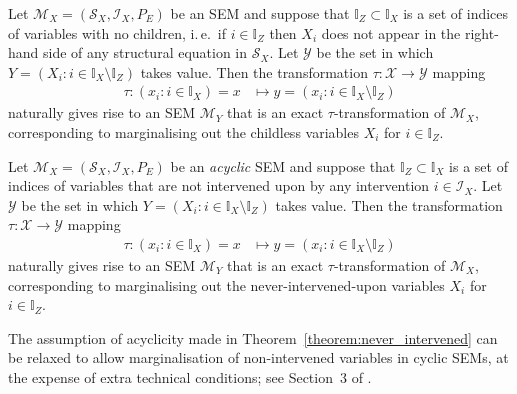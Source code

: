 \medskip

\begin{theorem}\label{theorem:childless}
Let $\mathcal{M}_X=(\mathcal{S}_X,\mathcal{I}_X,P_E)$ be an SEM and suppose that ${\mathbb{I}_Z\subset\mathbb{I}_X}$ is a set of indices of variables with no children, i.\,e.\ if $i\in\mathbb{I}_Z$ then $X_i$ does not appear in the right-hand side of any structural equation in $\mathcal{S}_X$.
Let $\mathcal{Y}$ be the set in which $Y = \left( X_i: i\in\mathbb{I}_X\setminus \mathbb{I}_Z \right)$ takes value.
Then the transformation $\tau: \mathcal{X} \to \mathcal{Y}$ mapping
\begin{align*}
   \tau: \left( x_i: i\in\mathbb{I}_X \right) = x &\mapsto y = \left( x_i: i\in\mathbb{I}_X\setminus \mathbb{I}_Z \right)
\end{align*}
naturally gives rise to an SEM $\mathcal{M}_Y$ that is an exact $\tau$-transformation of $\mathcal{M}_X$, corresponding to marginalising out the childless variables $X_i$ for $i\in\mathbb{I}_Z$.
\end{theorem}



\medskip


\begin{theorem}\label{theorem:never_intervened}
Let $\mathcal{M}_X=(\mathcal{S}_X,\mathcal{I}_X,P_E)$ be an \emph{acyclic} SEM and suppose that ${\mathbb{I}_Z\subset\mathbb{I}_X}$ is a set of indices of variables that are not intervened upon by any intervention $i\in\mathcal{I}_X$.
Let $\mathcal{Y}$ be the set in which $Y = \left( X_i: i\in\mathbb{I}_X\setminus \mathbb{I}_Z \right)$ takes value.
Then the transformation $\tau: \mathcal{X} \to \mathcal{Y}$ mapping
\begin{align*}
   \tau: \left( x_i: i\in\mathbb{I}_X \right) = x &\mapsto y = \left( x_i: i\in\mathbb{I}_X\setminus \mathbb{I}_Z \right)
\end{align*}
naturally gives rise to an SEM $\mathcal{M}_Y$ that is an exact $\tau$-transformation of $\mathcal{M}_X$, corresponding to marginalising out the never-intervened-upon variables $X_i$ for $i\in\mathbb{I}_Z$.
\end{theorem}

\medskip

The assumption of acyclicity made in Theorem~\ref{theorem:never_intervened} can be relaxed to allow marginalisation of non-intervened variables in cyclic SEMs, at the expense of extra technical conditions; see Section~3 of \cite{bongers2016structural}.

